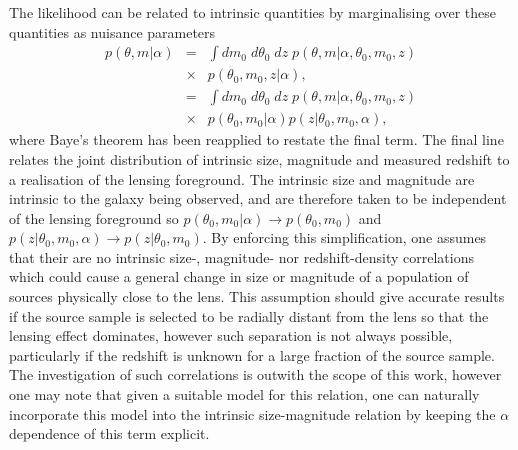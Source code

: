 \documentclass[useAMS,usenatbib,times,letter,amssymb]{mn2e}
\def\bea{\begin{eqnarray}}
\def\eea{\end{eqnarray}}
\begin{document}
The likelihood can be related to intrinsic quantities by marginalising over these quantities as nuisance parameters
\bea
p(\theta, m|\alpha) &=& \int dm_0\;d\theta_0\;dz\; p(\theta, m|\alpha, \theta_0, m_0, z)\nonumber\\
&\times&p(\theta_0, m_0, z|\alpha),\\
& = & \int dm_0\;d\theta_0\;dz\; p(\theta, m|\alpha, \theta_0, m_0, z)\nonumber\\
&\times&p(\theta_0, m_0|\alpha)p(z|\theta_0,m_0,\alpha), \label{eqn:Likelihood_FirstExpansion}
\eea
where Baye's theorem has been reapplied to restate the final term. The final line relates the joint distribution of intrinsic size, magnitude and measured redshift to a realisation of the lensing foreground. The intrinsic size and magnitude are intrinsic to the galaxy being observed, and are therefore taken to be independent of the lensing foreground so $p(\theta_0, m_0|\alpha) \to p(\theta_0, m_0)$ and $p(z|\theta_0,m_0,\alpha) \to p(z|\theta_0,m_0)$. By enforcing this simplification, one assumes that their are no intrinsic size-, magnitude- nor redshift-density correlations which could cause a general change in size or magnitude of a population of sources physically close to the lens. This assumption should give accurate results if the source sample is selected to be radially distant from the lens so that the lensing effect dominates, however such separation is not always possible, particularly if the redshift is unknown for a large fraction of the source sample. The investigation of such correlations is outwith the scope of this work, however one may note that given a suitable model for this relation, one can naturally incorporate this model into the intrinsic size-magnitude relation by keeping the $\alpha$ dependence of this term explicit. 
\end{document}
